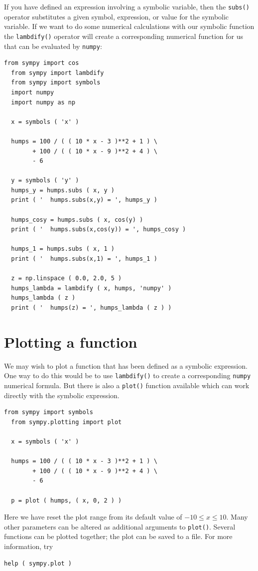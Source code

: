 \documentclass{article}
\begin{document}
If you have defined an expression involving a symbolic variable,
then the {\tt{subs()}} operator substitutes a given symbol,
expression, or value for the symbolic variable. 
If we want to do some numerical calculations with our symbolic
function the {\tt{lambdify()}} operator will create a corresponding
numerical function for us that can be evaluated by {\tt{numpy}}:
\begin{lstlisting}[numbers=none]
  from sympy import cos
  from sympy import lambdify
  from sympy import symbols
  import numpy
  import numpy as np

  x = symbols ( 'x' )

  humps = 100 / ( ( 10 * x - 3 )**2 + 1 ) \
        + 100 / ( ( 10 * x - 9 )**2 + 4 ) \
        - 6

  y = symbols ( 'y' )
  humps_y = humps.subs ( x, y )
  print ( '  humps.subs(x,y) = ', humps_y )

  humps_cosy = humps.subs ( x, cos(y) )
  print ( '  humps.subs(x,cos(y)) = ', humps_cosy )

  humps_1 = humps.subs ( x, 1 )
  print ( '  humps.subs(x,1) = ', humps_1 )
  
  z = np.linspace ( 0.0, 2.0, 5 )
  humps_lambda = lambdify ( x, humps, 'numpy' )
  humps_lambda ( z )
  print ( '  humps(z) = ', humps_lambda ( z ) )
\end{lstlisting}

\section{Plotting a function}

We may wish to plot a function that has been defined as a
symbolic expression.  One way to do this would be to use
{\tt{lambdify()}} to create a corresponding {\tt{numpy}}
numerical formula.  But there is also a {\tt{plot()}} 
function available which can work directly with the 
symbolic expression.
\begin{lstlisting}[numbers=none]
  from sympy import symbols
  from sympy.plotting import plot

  x = symbols ( 'x' )

  humps = 100 / ( ( 10 * x - 3 )**2 + 1 ) \
        + 100 / ( ( 10 * x - 9 )**2 + 4 ) \
        - 6

  p = plot ( humps, ( x, 0, 2 ) )
\end{lstlisting}
Here we have reset the plot range from its default value
of $-10 \leq x \leq 10$.  Many other parameters can
be altered as additional arguments to {\tt{plot()}}.
Several functions can be plotted together; the plot
can be saved to a file.  For more information, try
\begin{lstlisting}[numbers=none]
help ( sympy.plot )
\end{lstlisting}
\end{document}
